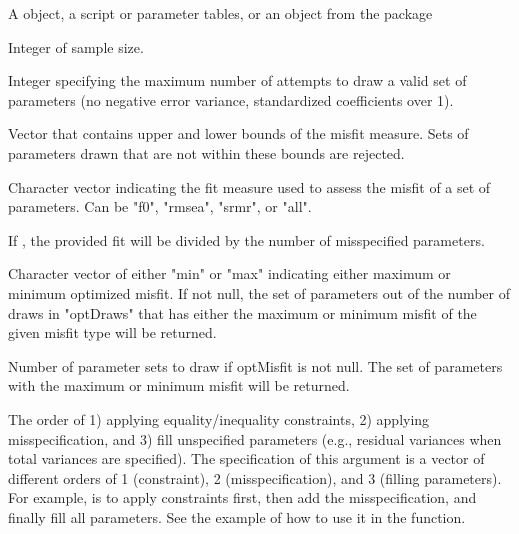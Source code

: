 \documentclass[a4paper]{book}
\begin{document}
\begin{Arguments}
\begin{ldescription}
\item[\code{model}] 
A  object, a  script or parameter tables, or an  object from the  package

\item[\code{n}] 
Integer of sample size.

\item[\code{maxDraw}] 
Integer specifying the maximum number of attempts to draw a valid set of parameters (no negative error variance, standardized coefficients over 1).

\item[\code{misfitBounds}]  
Vector that contains upper and lower bounds of the misfit measure. Sets of parameters drawn that are not within these bounds are rejected.

\item[\code{misfitType}]  
Character vector indicating the fit measure used to assess the misfit of a set of parameters. Can be "f0", "rmsea", "srmr", or "all". 

\item[\code{averageNumMisspec}]  
If , the provided fit will be divided by the number of misspecified parameters. 

\item[\code{optMisfit}]  
Character vector of either "min" or "max" indicating either maximum or minimum optimized misfit. If not null, the set of parameters out of the number of draws in "optDraws" that has either the maximum or minimum misfit of the given misfit type will be returned.

\item[\code{optDraws}]  
Number of parameter sets to draw if optMisfit is not null. The set of parameters with the maximum or minimum misfit will be returned.

\item[\code{createOrder}] 
The order of 1) applying equality/inequality constraints, 2) applying misspecification, and 3) fill unspecified parameters (e.g., residual variances when total variances are specified). The specification of this argument is a vector of different orders of 1 (constraint), 2 (misspecification), and 3 (filling parameters). For example,  is to apply constraints first, then add the misspecification, and finally fill all parameters. See the example of how to use it in the  function. 


\end{ldescription}
\end{Arguments}
\end{document}

